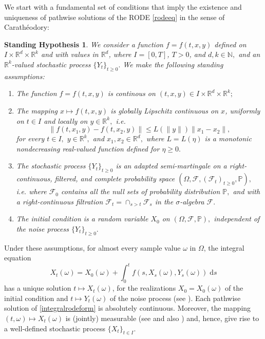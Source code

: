 \documentclass[reqno,12pt]{amsart}
\theoremstyle{plain} %
\newtheorem{stdhyp}{Standing Hypothesis}[section]
\theoremstyle{definition} %
\begin{document}
We start with a fundamental set of conditions that imply the existence and uniqueness of pathwise solutions of the RODE \eqref{rodeeq} in the sense of Carath\'eodory:
\begin{stdhyp}
    \label{standinghypotheses1}
    We consider a function $f=f(t, x, y)$ defined on $I\times \mathbb{R}^d\times\mathbb{R}^k$ and with values in $\mathbb{R}^d$, where $I=[0, T]$, $T > 0$, and $d, k\in \mathbb{N},$ and an $\mathbb{R}^k$-valued stochastic process $\{Y_t\}_{t\geq 0}.$ We make the following standing assumptions:
    \begin{enumerate}
        \item \label{standinghypothesisfcontinuous} The function $f = f(t, x, y)$ is continous on $(t, x, y)\in I \times \mathbb{R}^d \times \mathbb{R}^k;$
        \item \label{standinghypothesisLipschitzbound} The mapping $x \mapsto f(t, x, y)$ is globally Lipschitz continuous on $x$, uniformly on $t\in I$ and locally on $y\in \mathbb{R}^k,$ i.e.
        \begin{equation}
            \label{Ltassumptionbasic}
            \|f(t, x_1, y) - f(t, x_2, y)\| \leq L(\|y\|) \|x_1 - x_2\|,
        \end{equation}
        for every $t\in I,$ $y\in\mathbb{R}^k,$ and $x_1, x_2 \in\mathbb{R}^d,$ where $L=L(\eta)$ is a monotonic nondecreasing real-valued function defined for $\eta \geq 0.$

        \item \label{standinghypothesisnoise} The stochastic process $\{Y_t\}_{t\geq 0}$ is an adapted semi-martingale on a right-continuous, filtered, and complete probability space $(\Omega, \mathcal{F}, (\mathcal{F}_t)_{t\geq 0}, \mathbb{P}),$ i.e. where $\mathcal{F}_0$ contains all the null sets of probability distribution $\mathbb{P},$ and with a right-continuous filtration $\mathcal{F}_t = \cap_{s > t} \mathcal{F}_s$ in the $\sigma$-algebra $\mathcal{F}.$
        
        \item \label{standinghypothesisic} The initial condition is a random variable $X_0$ on $(\Omega, \mathcal{F}, \mathbb{P}),$ independent of the noise process $\{Y_t\}_{t \geq 0}.$
    \end{enumerate}
\end{stdhyp}

Under these assumptions, for almost every sample value $\omega$ in $\Omega$, the integral equation
\begin{equation}
    \label{integralrodeform}
    X_t(\omega) = X_0(\omega) + \int_0^t f(s, X_s(\omega), Y_s(\omega)) \;\mathrm{d}s
\end{equation}
has a unique solution $t\mapsto X_t(\omega)$, for the realizations $X_0 = X_0(\omega)$ of the initial condition and $t\mapsto Y_t(\omega)$ of the noise process (see \cite[Theorem 1.1]{CoddingtonLevinson1985}). Each pathwise solution of \eqref{integralrodeform} is absolutely continuous. Moreover, the mapping $(t, \omega) \mapsto X_t(\omega)$ is (jointly) measurable (see \cite[Section 2.1.2]{HanKloeden2017} and also \cite[Lemma 4.51]{AB2006}) and, hence, give rise to a well-defined stochastic process $\{X_t\}_{t\in I}.$
\end{document}
